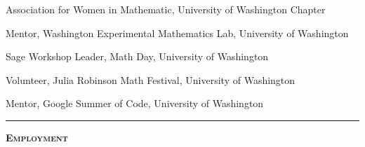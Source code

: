 \documentclass[12pt]{article}
\newcommand{\sectionheading}[1]
{
\bigskip %
\noindent
\hspace{-6.5mm}\textcolor{Gray}{\rule[.75mm]{21.5mm}{1mm}} %
\hspace{.2mm}	%
{\large{\textbf{\textsc{#1}}}} %
}
\newenvironment{date_section}
	{
	\vspace{-1ex}
	\leftmargini = 15ex
		\begin{itemize}[
			labelsep = *,
			labelwidth = 9ex,
			labelindent = 0ex,
			itemindent = !,
			font=\normalfont,
			align=parleft
		]{}
		\itemsep=-1.5mm
	}
	{\end{itemize}\vspace{-2ex}}
\newcommand{\yearmo}[2]{
	\item[
		{\makebox[1ex][r]{#1}}
		\hspace{1ex}
		{\makebox[1ex][l]{#2} }
		] }
\newcommand{\yearrange}[2]{
	\item[
		{\makebox[1ex][r]{#1}}
		--
		{\makebox[1ex][l]{#2} }
		] }
\begin{document}
		\begin{date_section}
			
			\yearrange{2015}{2018}
				Association for Women in Mathematic,
				University of Washington Chapter
			
			\yearrange{2016}{2017}
				Mentor,
				Washington Experimental Mathematics Lab,
				University of Washington
				
			\yearmo{}{2017} %
				Sage Workshop Leader,
				Math Day,
				University of Washington
				
			\yearmo{}{2017} %
				Volunteer,
				Julia Robinson Math Festival,
				University of Washington

			\yearmo{}{2016} %
				Mentor,
				Google Summer of Code,
				University of Washington

%			
%
%
%
%

		\end{date_section}


	\sectionheading{Employment}%
	
\end{document}
